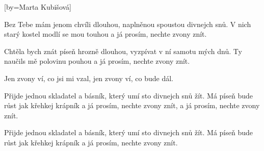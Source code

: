 [by={Marta Kubišová}]

\beginverse{}
Bez Tebe mám jenom chvíli dlouhou,
naplněnou spoustou divnejch snů.
V nich starý kostel modlí se mou touhou
a já prosím, nechte zvony znít. 
\endverse{}

\beginverse{}
Chtěla bych znát píseň hrozně dlouhou,
vyzpívat v ní samotu mých dnů.
Ty naučils mě polovinu pouhou
a já prosím, nechte zvony znít. 
\endverse{}

\beginchorus{}
Jen zvony ví, co jsi mi vzal, 
jen zvony ví, co bude dál.  
\endchorus{}

\beginverse{}
Přijde jednou skladatel a básník,
který umí sto divnejch snů žít.
Má píseň bude růst jak křehkej krápník
a já prosím, nechte zvony znít, 
a já prosím, nechte zvony znít. 
\endverse{}

\beginchorus{}

\endchorus{}

\beginverse{}
Přijde jednou skladatel a básník,
který umí sto divnejch snů žít.
Má píseň bude růst jak křehkej krápník
\lrep{} a já prosím, nechte zvony znít.  \rrep{}
\endverse{}

\endsong{}
